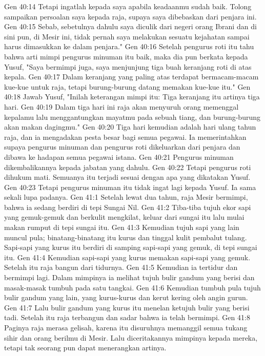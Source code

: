 Gen 40:14  Tetapi ingatlah kepada saya apabila keadaanmu sudah baik. Tolong sampaikan persoalan saya kepada raja, supaya saya dibebaskan dari penjara ini.
Gen 40:15  Sebab, sebetulnya dahulu saya diculik dari negeri orang Ibrani dan di sini pun, di Mesir ini, tidak pernah saya melakukan sesuatu kejahatan sampai harus dimasukkan ke dalam penjara."
Gen 40:16  Setelah pengurus roti itu tahu bahwa arti mimpi pengurus minuman itu baik, maka dia pun berkata kepada Yusuf, "Saya bermimpi juga, saya menjunjung tiga buah keranjang roti di atas kepala.
Gen 40:17  Dalam keranjang yang paling atas terdapat bermacam-macam kue-kue untuk raja, tetapi burung-burung datang memakan kue-kue itu."
Gen 40:18  Jawab Yusuf, "Inilah keterangan mimpi itu: Tiga keranjang itu artinya tiga hari.
Gen 40:19  Dalam tiga hari ini raja akan menyuruh orang memenggal kepalamu lalu menggantungkan mayatmu pada sebuah tiang, dan burung-burung akan makan dagingmu."
Gen 40:20  Tiga hari kemudian adalah hari ulang tahun raja, dan ia mengadakan pesta besar bagi semua pegawai. Ia memerintahkan supaya pengurus minuman dan pengurus roti dikeluarkan dari penjara dan dibawa ke hadapan semua pegawai istana.
Gen 40:21  Pengurus minuman dikembalikannya kepada jabatan yang dahulu.
Gen 40:22  Tetapi pengurus roti dihukum mati. Semuanya itu terjadi sesuai dengan apa yang dikatakan Yusuf.
Gen 40:23  Tetapi pengurus minuman itu tidak ingat lagi kepada Yusuf. Ia sama sekali lupa padanya.
Gen 41:1  Setelah lewat dua tahun, raja Mesir bermimpi, bahwa ia sedang berdiri di tepi Sungai Nil.
Gen 41:2  Tiba-tiba tujuh ekor sapi yang gemuk-gemuk dan berkulit mengkilat, keluar dari sungai itu lalu mulai makan rumput di tepi sungai itu.
Gen 41:3  Kemudian tujuh sapi yang lain muncul pula; binatang-binatang itu kurus dan tinggal kulit pembalut tulang. Sapi-sapi yang kurus itu berdiri di samping sapi-sapi yang gemuk, di tepi sungai itu.
Gen 41:4  Kemudian sapi-sapi yang kurus memakan sapi-sapi yang gemuk. Setelah itu raja bangun dari tidurnya.
Gen 41:5  Kemudian ia tertidur dan bermimpi lagi. Dalam mimpinya ia melihat tujuh bulir gandum yang berisi dan masak-masak tumbuh pada satu tangkai.
Gen 41:6  Kemudian tumbuh pula tujuh bulir gandum yang lain, yang kurus-kurus dan kerut kering oleh angin gurun.
Gen 41:7  Lalu bulir gandum yang kurus itu menelan ketujuh bulir yang berisi tadi. Setelah itu raja terbangun dan sadar bahwa ia telah bermimpi.
Gen 41:8  Paginya raja merasa gelisah, karena itu disuruhnya memanggil semua tukang sihir dan orang berilmu di Mesir. Lalu diceritakannya mimpinya kepada mereka, tetapi tak seorang pun dapat menerangkan artinya.
